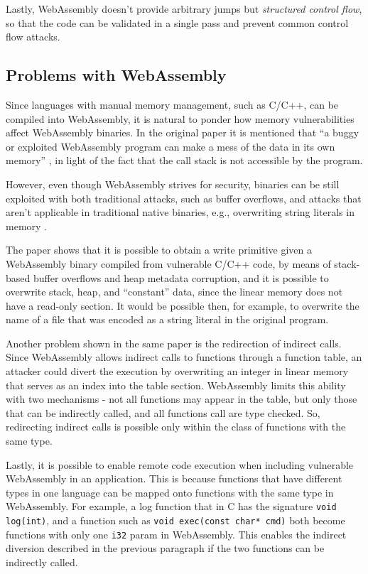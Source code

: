 Lastly, WebAssembly doesn't provide arbitrary jumps but \textit{structured control flow},
so that the code can be validated in a single pass and prevent common control flow attacks.

\subsection{Problems with WebAssembly}

Since languages with manual memory management, such as C/C++, can be compiled into WebAssembly,
it is natural to ponder how memory vulnerabilities affect WebAssembly binaries.
In the original paper it is mentioned that ``a buggy or exploited WebAssembly program can make a mess of the data in its own memory''
\cite{bringing-the-web-up-to-speed-2017}, in light of the fact that the call stack is not accessible by the program.

However, even though WebAssembly strives for security, binaries can be still exploited with both traditional attacks,
such as buffer overflows, and attacks that aren't applicable in traditional native binaries, e.g., overwriting
string literals in memory \cite{binary-security-wasm-2020}.

The paper shows that it is possible to obtain a write primitive given a WebAssembly binary compiled from vulnerable C/C++ code,
by means of stack-based buffer overflows and heap metadata corruption, and it is possible to overwrite stack, heap, and ``constant''
data, since the linear memory does not have a read-only section. It would be possible then, for example, to overwrite the name
of a file that was encoded as a string literal in the original program.

Another problem shown in the same paper is the redirection of indirect calls. Since WebAssembly allows indirect calls
to functions through a function table, an attacker could divert the execution by overwriting an integer in linear memory
that serves as an index into the table section. WebAssembly limits this ability with two mechanisms - not all functions
may appear in the table, but only those that can be indirectly called, and all functions call are type checked.
So, redirecting indirect calls is possible only within the class of functions with the same type.

Lastly, it is possible to enable remote code execution when including vulnerable WebAssembly in an application.
This is because functions that have different types in one language can be mapped onto functions with the same type
in WebAssembly. For example, a log function that in C has the signature \texttt{void log(int)}, and a function such as
\texttt{void exec(const char* cmd)} both become functions with only one \texttt{i32} param in WebAssembly.
This enables the indirect diversion described in the previous paragraph if the two functions can be indirectly called.

